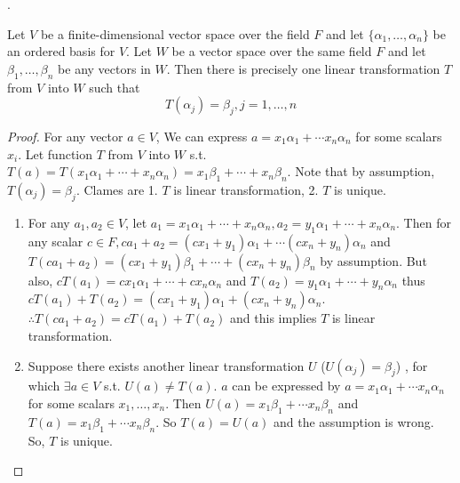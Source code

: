 \documentclass[8pt]{beamer}
\begin{document}
\begin{frame}{.}
    \begin{theorem}\label{th:1}
        Let $V$ be a finite-dimensional vector space over the field $F$ and let $\{\alpha_1, \dots, \alpha_n\}$ be an ordered basis for $V$.
        Let $W$ be a vector space over the same field $F$ and let $\beta_1, \dots, \beta_n$ be any vectors in $W$. Then there is precisely one linear transformation $T$ from $V$ into $W$ such that
        \[
            T(\alpha_j) = \beta_j, j=1, \dots, n
        \]
    \end{theorem}
    \begin{proof}
        For any vector $a \in V$, We can express $a = x_1 \alpha_1 + \cdots x_n \alpha_n$ for some scalars $x_i$.
        Let function $T$ from $V$ into $W$ s.t. $T(a) = T(x_1 \alpha_1 + \cdots + x_n \alpha_n) = x_1 \beta_1 + \cdots + x_n \beta_n$.
        Note that by assumption, $T(\alpha_j) = \beta_j$.
        Clames are 1. $T$ is linear transformation, 2. $T$ is unique.

        \begin{enumerate}
            \item For any $a_1, a_2 \in V$, let $a_1 = x_1 \alpha_1 + \cdots + x_n \alpha_n, a_2 = y_1 \alpha_1 + \cdots + x_n \alpha_n$. 
            Then for any scalar $c \in F, ca_1 + a_2 = (cx_1 + y_1)\alpha_1 + \cdots (cx_n + y_n) \alpha_n$ and $T(ca_1 + a_2) = (cx_1 + y_1)\beta_1 + \cdots + (cx_n + y_n)\beta_n$ by assumption.
            But also, $cT(a_1) = cx_1 \alpha_1 + \cdots + cx_n \alpha_n$ and $T(a_2) = y_1 \alpha_1 + \cdots + y_n \alpha_n$ thus $cT(a_1) + T(a_2) = (cx_1 + y_1) \alpha_1 + (cx_n + y_n) \alpha_n$.
            $\therefore T(ca_1 + a_2) = cT(a_1) + T(a_2)$ and this implies $T$ is linear transformation.
            \item Suppose there exists another linear transformation $U$ ($U(\alpha_j) = \beta_j$) , for which $\exists a \in V$ s.t. $U(a) \neq T(a)$. $a$ can be expressed by $a = x_1 \alpha_1 + \cdots x_n \alpha_n$ for some scalars $x_1, \dots, x_n$. Then $U(a) = x_1 \beta_1 + \cdots x_n \beta_n$ and $T(a) = x_1 \beta_1 + \cdots x_n \beta_n$. So $T(a) = U(a)$ and the assumption is wrong. So, $T$ is unique.
        \end{enumerate}
    \end{proof}
\end{frame}
\end{document}
